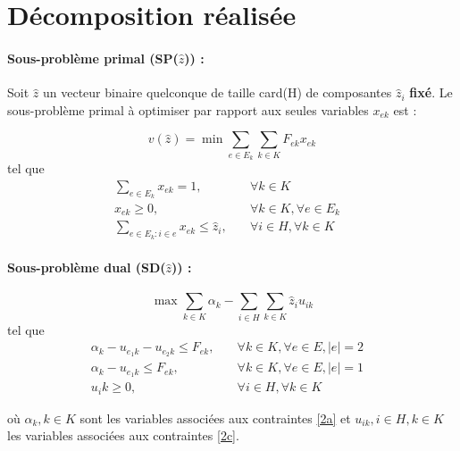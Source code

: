 \section{Décomposition réalisée}

\paragraph{Sous-problème primal (SP($\hat{z}$)) :}
Soit $\hat{z}$ un vecteur binaire quelconque de taille card(H) de composantes $\hat{z}_i$ \textbf{fixé}. Le sous-problème primal à optimiser par rapport aux seules variables $x_{ek}$ est : 

\[v(\hat{z}) =  \min \sum_{e \in E_k}\sum_{k \in K}F_{ek}x_{ek}\]
tel que
\begin{subequations}
    \begin{align}
        \sum_{e \in E_k}x_{ek} = 1, \quad &\forall{k\in K} \label{2a} &\\
        x_{ek} \ge 0, \quad &\forall{k \in K}, \forall{e \in E_k} \label{2b}&\\
        \sum_{e \in E_k:i\in e}x_{ek} \le \hat{z}_i,\quad &\forall{i \in H}, \forall{k\in K}\label{2c}
    \end{align}
\end{subequations}



\smallskip

\paragraph{Sous-problème dual (SD($\hat{z}$)) : } 

\[ \max \sum_{k \in K}\alpha_k - \sum_{i \in H}\sum_{k \in K} \hat{z}_iu_{ik}\]
tel que
\begin{subequations}
    \begin{align}
        \alpha_k - u_{e_1k} - u_{e_2k} \le F_{ek}, \quad &\forall{k\in K}, \forall{e \in E}, |e| = 2&\\
        \alpha_k - u_{e_1k} \le F_{ek}, \quad &\forall{k\in K}, \forall{e \in E}, |e| = 1&\\
        u_ik \ge 0, \quad &\forall{i \in H}, \forall{k \in K}
    \end{align}
\end{subequations}

où $\alpha_k, k\in K$ sont les variables associées aux contraintes \ref{2a} et $u_{ik}, i \in H, k \in K$ les variables associées aux contraintes \ref{2c}.



